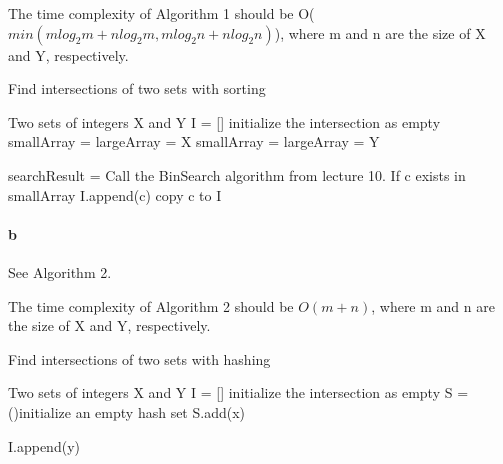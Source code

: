 \documentclass[paper=a4, fontsize=11pt]{scrartcl} %
\numberwithin{equation}{section} %
\numberwithin{figure}{section} %
\numberwithin{table}{section} %
\begin{document}
The time complexity of Algorithm 1 should be O($min(mlog_2m+nlog_2m, mlog_2n+nlog_2n)$), where m and n are the size of X and Y, respectively.
\begin{algorithm}
	\caption{Find intersections of two sets with sorting}
	\begin{algorithmic}[1]
		\Require Two sets of integers X and Y
            \State I = [] \Comment initialize the intersection as empty
            \State smallArray = 
            \State largeArray = X
            \Else
            \State smallArray = 
            \State largeArray = Y

            \EndIf

            \State searchResult = 
            \State \Comment Call the BinSearch algorithm from lecture 10.
             \Comment If c exists in smallArray
            \State I.append(c) \Comment copy c to I


            \EndIf


            \EndFor
            \State {}

            
			
		\EndFunction
	\end{algorithmic}

\end{algorithm}

\paragraph{b}
See Algorithm 2.

The time complexity of Algorithm 2 should be $ O(m+n)$, where m and n are the size of X and Y, respectively.

\begin{algorithm}
	\caption{Find intersections of two sets with hashing}
	\begin{algorithmic}[1]
		\Require Two sets of integers X and Y
            \State I = [] \Comment initialize the intersection as empty
            \State S = ()\Comment initialize an empty hash set
            \State S.add(x)

            \EndFor
            \State I.append(y)

            \EndIf

            \EndFor
            \State {}

            
			
		\EndFunction
	\end{algorithmic}

\end{algorithm}
\end{document}
